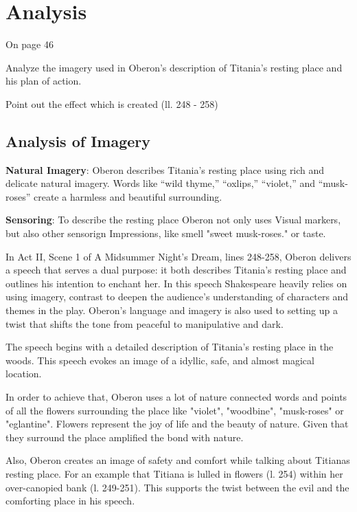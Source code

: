 \section{Analysis}

\startframedtask
On page 46

Analyze the imagery used in Oberon's description of Titania's resting place and his plan of action.

Point out the effect which is created (ll. 248 - 258)
\stopframedtask


\subsection{Analysis of Imagery}

\startitemize[packed]

\item {\bf Natural Imagery}: Oberon describes Titania’s resting place using rich and delicate natural imagery. Words like “wild thyme,” “oxlips,” “violet,” and “musk-roses” create a harmless and beautiful surrounding.  
\item {\bf Sensoring}: To describe the resting place Oberon not only uses Visual markers, but also other sensorign Impressions, like smell "sweet musk-roses." or taste.

\stopitemize

In Act II, Scene 1 of A Midsummer Night's Dream, lines 248-258, Oberon delivers
a speech that serves a dual purpose: it both describes Titania’s resting place
and outlines his intention to enchant her. In this speech Shakespeare heavily
relies on using imagery, contrast to deepen the audience’s understanding of
characters and themes in the play. Oberon’s language  and imagery is also used
to setting up a twist that shifts the tone from peaceful to manipulative and
dark.

The speech begins with a detailed description of Titania's resting place in the
woods. This speech evokes an image of a idyllic, safe, and almost magical
location.

In order to achieve that, Oberon uses a lot of nature connected words and
points of all the flowers surrounding the place like "violet", "woodbine",
"musk-roses" or "eglantine". Flowers represent the joy of life and the beauty
of nature. Given that they surround the place amplified the bond with nature. 

Also, Oberon creates an image of safety and comfort while talking about
Titianas resting place. For an example that Titiana is lulled in flowers (l.
254) within her over-canopied bank (l. 249-251). This supports the twist
between the evil and the comforting place in his speech.

